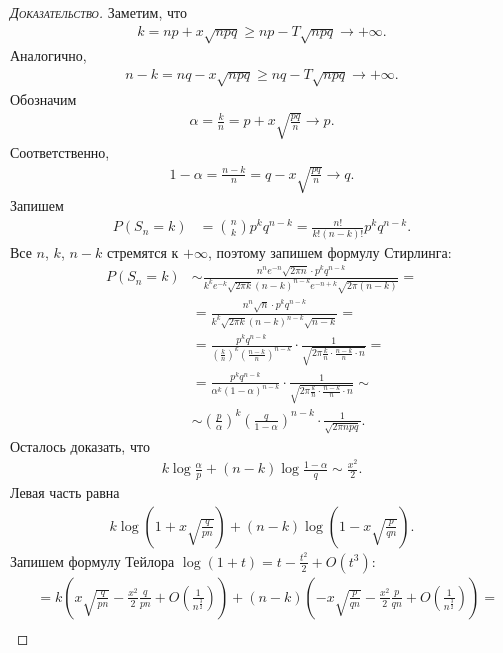 \begin{proof}[\normalfont\textsc{Доказательство}]
 Заметим, что
 \begin{align*}
  k = np + x \sqrt{npq} \geqslant np - T \sqrt{npq} \to +\infty.
 \end{align*} Аналогично,
 \begin{align*}
  n - k = nq - x \sqrt{npq} \geqslant nq - T \sqrt{npq} \to +\infty
 .\end{align*} Обозначим
 \begin{align*}
  \alpha = \frac{k}{n} = p + x\sqrt{\frac{pq}{n}} \to p
 .\end{align*} Соответственно,
 \begin{align*}
  1 - \alpha = \frac{n - k}{n} = q - x \sqrt{\frac{pq}{n}} \to q.
 \end{align*} Запишем
 \begin{align*}
  P(S_n = k) &= \binom n k p^{k}q^{n-k} = \frac{n!}{k!(n-k)!} p^{k}q^{n-k}.
 \end{align*} Все $n$, $k$, $n - k$ стремятся к  $+\infty$, поэтому запишем формулу Стирлинга:
 \begin{align*}
  P(S_n = k) &\sim \frac{n^{n}e^{-n}\sqrt{2\pi n} \cdot p^{k}q^{n-k}}{k^{k}e^{-k}\sqrt{2\pi k}(n-k)^{n-k}e^{-n+k}\sqrt{2\pi (n-k)}} = \\
  &= \frac{n^{n}\sqrt{n} \cdot p^{k}q^{n-k}}{k^{k}\sqrt{2\pi k}(n-k)^{n-k} \sqrt{n-k}} = \\
  &= \frac{p^{k}q^{n-k}}{(\frac{k}{n})^{k}(\frac{n-k}{n})^{n-k}} \cdot \frac{1}{\sqrt{2 \pi \frac{k}{n} \cdot \frac{n-k}{n} \cdot n}} = \\
  &= \frac{p^{k}q^{n-k}}{\alpha^{k}(1 - \alpha)^{n-k}} \cdot \frac{1}{\sqrt{2 \pi \frac{k}{n} \cdot \frac{n-k}{n} \cdot n}} \sim \\
  &\sim \left(\frac{p}{\alpha}\right)^{k} \left( \frac{q}{1 - \alpha} \right)^{n-k} \cdot \frac{1}{\sqrt{2 \pi npq}}
 .\end{align*} Осталось доказать, что
 \begin{align*}
  k \log \frac{\alpha}{p} + (n-k) \log \frac{1 - \alpha}{q} \sim \frac{x^{2}}{2}
 .\end{align*} Левая часть равна
 \begin{align*}
  k \log\left(1 + x \sqrt{\frac{q}{pn}}\right) + (n-k)\log \left( 1 - x \sqrt{\frac{p}{qn}} \right).
 \end{align*} Запишем формулу Тейлора $\log(1 + t) = t - \frac{t^{2}}{2} + O(t^{3})$:
 \begin{align*}
  &= k \left(x \sqrt{\frac{q}{pn}} - \frac{x^{2}}{2} \frac{q}{pn} + O\left(\frac{1}{n^{\frac{3}{2}}}\right)\right) + (n-k) \left( -x \sqrt{\frac{p}{qn}}  - \frac{x^{2}}{2} \frac{p}{qn} + O \left( \frac{1}{n^{\frac{3}{2}}} \right) \right) = \\

\end{align*}
\end{proof}
